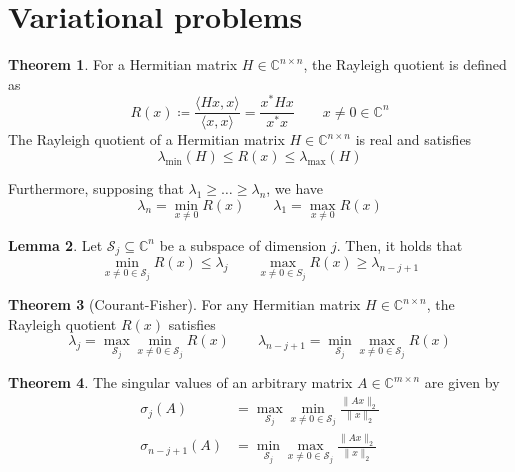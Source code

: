 \documentclass[12pt, openany]{report}
\theoremstyle{definition}
\newtheorem{thm}{Theorem}[chapter]
\newtheorem{lem}[thm]{Lemma}
\newcommand{\C}{\mathbb{C}}
\begin{document}
\section{Variational problems}
\begin{thm}
    For a Hermitian matrix $H\in \C^{n\times n}$, the Rayleigh quotient is defined as 
    \begin{equation}
        R(x) \coloneqq \frac{\langle Hx,x\rangle}{\langle x,x\rangle} = \frac{x^*Hx}{x^*x} \qquad x\neq 0\in \C^n
    \end{equation}
    The Rayleigh quotient of a Hermitian matrix $H\in \C^{n\times n}$ is real and satisfies 
    \begin{equation}
        \lambda_{\min}(H) \le R(x)\le \lambda_{\max}(H)
    \end{equation}
\end{thm}
Furthermore, supposing that $\lambda_1\ge \dots\ge \lambda_n$, we have
\begin{equation}
    \lambda_n=\min_{x\neq 0}R(x) \qquad \lambda_1 = \max_{x\neq 0}R(x)
\end{equation}
\begin{lem}
    Let $\mathcal{S}_j \subseteq \C^n$ be a subspace of dimension $j$. Then, it holds that 
    \begin{equation}
        \min_{x\neq 0\in \mathcal{S}_j} R(x)\le \lambda_j\qquad \max_{x\neq 0\in S_j}R(x)\ge \lambda_{n-j+1}
    \end{equation}
\end{lem}
\begin{thm}[Courant-Fisher]
    For any Hermitian matrix $H\in \C^{n\times n}$, the Rayleigh quotient $R(x)$ satisfies 
    \begin{equation}
        \lambda_j=\max_{\mathcal{S}_j} \min_{x\neq 0 \in \mathcal{S}_j} R(x)\qquad \lambda_{n-j+1}=\min_{\mathcal{S}_j} \max_{x\neq 0 \in \mathcal{S}_j} R(x)
    \end{equation}
\end{thm}
\begin{thm}
    The singular values of an arbitrary matrix $A\in \C^{m\times n}$ are given by 
    \begin{align}
        \sigma_j(A) & = \max_{\mathcal{S}_j}\min_{x\neq 0\in \mathcal{S}_j} \frac{\lVert Ax\rVert_2}{\lVert x\rVert_2}\\
        \sigma_{n-j+1}(A) & = \min_{\mathcal{S}_j}\max_{x\neq 0\in \mathcal{S}_j} \frac{\lVert Ax\rVert_2}{\lVert x\rVert_2}
    \end{align}
\end{thm}
\end{document}
